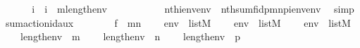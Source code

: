 \begin{isabellebody}
\isanewline
\ \ \isamarkupfalse%
\ \isamarkupfalse%
\ {\isachardoublequoteopen}{\isasymAnd}\ i\ {\isachardot}{\kern0pt}\ i\ {\isacharless}{\kern0pt}\ {\isacharquery}{\kern0pt}m{\isacharhash}{\kern0pt}{\isacharplus}{\kern0pt}length{\isacharparenleft}{\kern0pt}env{}{\isacharparenright}{\kern0pt}\ {\isasymLongrightarrow}\isanewline
\ \ \ \ \ \ \ \ \ \ nth{\isacharparenleft}{\kern0pt}i{\isacharcomma}{\kern0pt}env{\isacharat}{\kern0pt}env{}{\isacharparenright}{\kern0pt}\ {\isacharequal}{\kern0pt}\ nth{\isacharparenleft}{\kern0pt}sum{\isacharparenleft}{\kern0pt}f{\isacharcomma}{\kern0pt}id{\isacharparenleft}{\kern0pt}{\isacharquery}{\kern0pt}p{\isacharparenright}{\kern0pt}{\isacharcomma}{\kern0pt}{\isacharquery}{\kern0pt}m{\isacharcomma}{\kern0pt}{\isacharquery}{\kern0pt}n{\isacharcomma}{\kern0pt}{\isacharquery}{\kern0pt}p{\isacharparenright}{\kern0pt}{\isacharbackquote}{\kern0pt}i{\isacharcomma}{\kern0pt}env{\isacharprime}{\kern0pt}{\isacharat}{\kern0pt}env{}{\isacharparenright}{\kern0pt}{\isachardoublequoteclose}\ \isamarkupfalse%
\ simp\isanewline
{}\isamarkupfalse%
%
\endisatagproof
{\isafoldproof}%
%
\isadelimproof
\isanewline
%
\endisadelimproof
\isanewline
{}\isamarkupfalse%
\ sum{\isacharunderscore}{\kern0pt}action{\isacharunderscore}{\kern0pt}id{\isacharunderscore}{\kern0pt}aux\ {\isacharcolon}{\kern0pt}\isanewline
\ \ \isanewline
\ \ \ \ {\isachardoublequoteopen}f\ {\isasymin}\ m{\isasymrightarrow}n{\isachardoublequoteclose}\isanewline
\ \ \ \ {\isachardoublequoteopen}env\ {\isasymin}\ list{\isacharparenleft}{\kern0pt}M{\isacharparenright}{\kern0pt}{\isachardoublequoteclose}\isanewline
\ \ \ \ {\isachardoublequoteopen}env{\isacharprime}{\kern0pt}\ {\isasymin}\ list{\isacharparenleft}{\kern0pt}M{\isacharparenright}{\kern0pt}{\isachardoublequoteclose}\isanewline
\ \ \ \ {\isachardoublequoteopen}env{}\ {\isasymin}\ list{\isacharparenleft}{\kern0pt}M{\isacharparenright}{\kern0pt}{\isachardoublequoteclose}\isanewline
\ \ \ \ {\isachardoublequoteopen}length{\isacharparenleft}{\kern0pt}env{\isacharparenright}{\kern0pt}\ {\isacharequal}{\kern0pt}\ m{\isachardoublequoteclose}\isanewline
\ \ \ \ {\isachardoublequoteopen}length{\isacharparenleft}{\kern0pt}env{\isacharprime}{\kern0pt}{\isacharparenright}{\kern0pt}\ {\isacharequal}{\kern0pt}\ n{\isachardoublequoteclose}\isanewline
\ \ \ \ {\isachardoublequoteopen}length{\isacharparenleft}{\kern0pt}env{}{\isacharparenright}{\kern0pt}\ {\isacharequal}{\kern0pt}\ p{\isachardoublequoteclose}\isanewline

\end{isabellebody}
